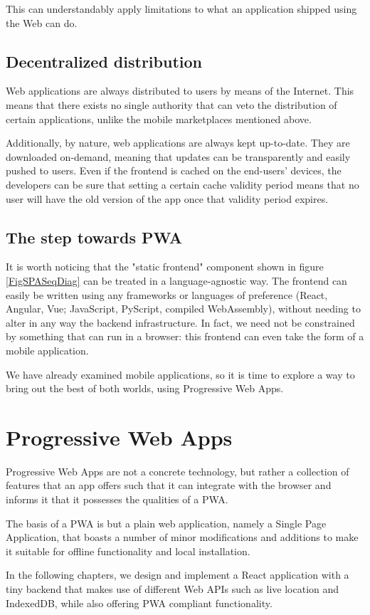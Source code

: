This can understandably apply limitations to what an application shipped using the Web can do.

\subsection{Decentralized distribution}
Web applications are always distributed to users by means of the Internet. This means that there exists no single authority that can veto the distribution of certain applications, unlike the mobile marketplaces mentioned above.

Additionally, by nature, web applications are always kept up-to-date. They are downloaded on-demand, meaning that updates can be transparently and easily pushed to users. Even if the frontend is cached on the end-users' devices, the developers can be sure that setting a certain cache validity period means that no user will have the old version of the app once that validity period expires.

\subsection{The step towards PWA}

It is worth noticing that the "static frontend" component shown in figure \ref{FigSPASeqDiag} can be treated in a language-agnostic way. The frontend can easily be written using any frameworks or languages of preference (React, Angular, Vue; JavaScript, PyScript, compiled WebAssembly), without needing to alter in any way the backend infrastructure. In fact, we need not be constrained by something that can run in a browser: this frontend can even take the form of a mobile application.

We have already examined mobile applications, so it is time to explore a way to bring out the best of both worlds, using Progressive Web Apps.

\section{Progressive Web Apps}

Progressive Web Apps are not a concrete technology, but rather a collection of features that an app offers such that it can integrate with the browser and informs it that it possesses the qualities of a PWA.

The basis of a PWA is but a plain web application, namely a Single Page Application, that boasts a number of minor modifications and additions to make it suitable for offline functionality and local installation.

In the following chapters, we design and implement a React application with a tiny backend that makes use of different Web APIs such as live location and IndexedDB, while also offering PWA compliant functionality.